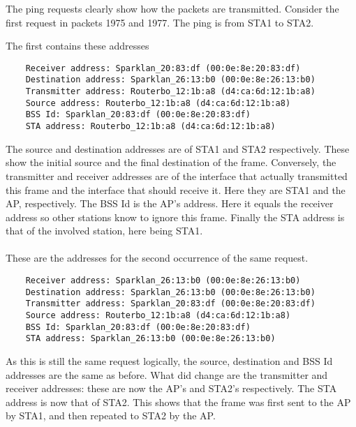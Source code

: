 The ping requests clearly show how the packets are transmitted. Consider the first request in packets 1975 and 1977. The ping is from STA1 to STA2.

The first contains these addresses
\begin{lstlisting}
    Receiver address: Sparklan_20:83:df (00:0e:8e:20:83:df)
    Destination address: Sparklan_26:13:b0 (00:0e:8e:26:13:b0)
    Transmitter address: Routerbo_12:1b:a8 (d4:ca:6d:12:1b:a8)
    Source address: Routerbo_12:1b:a8 (d4:ca:6d:12:1b:a8)
    BSS Id: Sparklan_20:83:df (00:0e:8e:20:83:df)
    STA address: Routerbo_12:1b:a8 (d4:ca:6d:12:1b:a8)
\end{lstlisting}
The source and destination addresses are of STA1 and STA2 respectively. These show the initial source and the final destination of the frame. Conversely, the transmitter and receiver addresses are of the interface that actually transmitted this frame and the interface that should receive it. Here they are STA1 and the AP, respectively. The BSS Id is the AP's address. Here it equals the receiver address so other stations know to ignore this frame. Finally the STA address is that of the involved station, here being STA1. \\ \\

These are the addresses for the second occurrence of the same request.
\begin{lstlisting}
    Receiver address: Sparklan_26:13:b0 (00:0e:8e:26:13:b0)
    Destination address: Sparklan_26:13:b0 (00:0e:8e:26:13:b0)
    Transmitter address: Sparklan_20:83:df (00:0e:8e:20:83:df)
    Source address: Routerbo_12:1b:a8 (d4:ca:6d:12:1b:a8)
    BSS Id: Sparklan_20:83:df (00:0e:8e:20:83:df)
    STA address: Sparklan_26:13:b0 (00:0e:8e:26:13:b0)
\end{lstlisting}
As this is still the same request logically, the source, destination and BSS Id addresses are the same as before. What did change are the transmitter and receiver addresses: these are now the AP's and STA2's respectively. The STA address is now that of STA2. This shows that the frame was first sent to the AP by STA1, and then repeated to STA2 by the AP.

